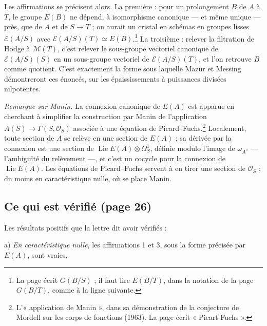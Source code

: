 \documentclass[11pt,a4paper]{article}
\begin{document}
Les affirmations se précisent alors. La première : pour un prolongement $B$ de
$A$ à $T$, le groupe $E(B)$ ne dépend, à isomorphisme canonique — et même
unique — près, que de $A$ et de $S \to T$ ; on aurait un cristal en schémas en
groupes lisses $\mathcal{E}(A/S)$ avec $\mathcal{E}(A/S)(T) \simeq E(B)$.\footnote{La
page écrit $G(B/S)$ ; il faut lire $E(B/T)$, dans la notation de la page
$G(B/T)$, comme à la ligne suivante.} La troisième : relever la filtration de
Hodge à $\mathcal{M}(T)$, c'est relever le sous-groupe vectoriel canonique de
$\mathcal{E}(A/S)(S)$ en un sous-groupe vectoriel de $\mathcal{E}(A/S)(T)$, et
l'on retrouve $B$ comme quotient. C'est exactement la forme sous laquelle
Mazur et Messing démontreront ces énoncés, sur les épaississements à
puissances divisées nilpotentes.

\emph{Remarque sur Manin.} La connexion canonique de $E(A)$ est apparue en
cherchant à simplifier la construction par Manin de l'application
$A(S) \to \Gamma(S, \mathcal{O}_S)$ associée à une équation de
Picard--Fuchs.\footnote{L'« application de Manin », dans sa démonstration de la
conjecture de Mordell sur les corps de fonctions (1963). La page écrit
« Picart-Fuchs ».} Localement, toute section de $A$ se relève en une section
de $E(A)$ ; sa dérivée par la connexion est une section de
$\operatorname{Lie}E(A) \otimes \Omega^1_S$, définie modulo l'image de
$\omega_{A^\vee}$ — l'ambiguïté du relèvement —, et c'est un cocycle pour la
connexion de $\operatorname{Lie}E(A)$. Les équations de Picard--Fuchs servent
à en tirer une section de $\mathcal{O}_S$ ; du moins en caractéristique nulle,
où se place Manin.

\subsection*{Ce qui est vérifié (page 26)}

Les résultats positifs que la lettre dit avoir vérifiés :

a) \emph{En caractéristique nulle}, les affirmations 1 et 3, sous la forme
précisée par $E(A)$, sont vraies.
\end{document}
